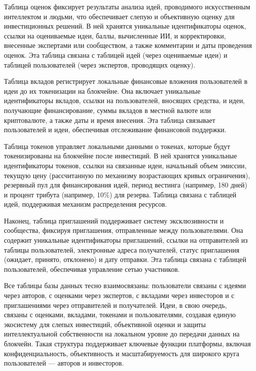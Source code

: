\documentclass[
    14pt,
    specialist,
    candidate, %
    subf, %
    href,
    dotsinheaders=false
]{disser}
\begin{document}
Таблица оценок фиксирует результаты анализа идей, проводимого искусственным интеллектом и людьми, что обеспечивает слепую и объективную оценку для инвестиционных решений. В ней хранятся уникальные идентификаторы оценок, ссылки на оцениваемые идеи, баллы, вычисленные ИИ, и корректировки, внесенные экспертами или сообществом, а также комментарии и даты проведения оценок. Эта таблица связана с таблицей идей (через оцениваемые идеи) и таблицей пользователей (через экспертов, проводящих оценку).

Таблица вкладов регистрирует локальные финансовые вложения пользователей в идеи до их токенизации на блокчейне. Она включает уникальные идентификаторы вкладов, ссылки на пользователей, вносящих средства, и идеи, получающие финансирование, суммы вкладов в местной валюте или криптовалюте, а также даты и время внесения. Эта таблица связывает пользователей и идеи, обеспечивая отслеживание финансовой поддержки.

Таблица токенов управляет локальными данными о токенах, которые будут токенизированы на блокчейне после инвестиций. В ней хранятся уникальные идентификаторы токенов, ссылки на связанные идеи, начальный объем эмиссии, текущую цену (рассчитанную по механизму возрастающих кривых ограничения), резервный пул для финансирования идей, период вестинга (например, 180 дней) и процент трибута (например, 10\%) для резерва. Таблица связана с таблицей идей, поддерживая механизм распределения ресурсов.

Наконец, таблица приглашений поддерживает систему эксклюзивности и сообщества, фиксируя приглашения, отправленные между пользователями. Она содержит уникальные идентификаторы приглашений, ссылки на отправителей из таблицы пользователей, электронные адреса получателей, статус приглашения (ожидает, принято, отклонено) и дату отправки. Эта таблица связана с таблицей пользователей, обеспечивая управление сетью участников.

Все таблицы базы данных тесно взаимосвязаны: пользователи связаны с идеями через авторов, с оценками через экспертов, с вкладами через инвесторов и с приглашениями через отправителей и получателей. Идеи, в свою очередь, связаны с оценками, вкладами, токенами и пользователями, создавая единую экосистему для слепых инвестиций, объективной оценки и защиты интеллектуальной собственности на локальном уровне до передачи данных на блокчейн. Такая структура поддерживает ключевые функции платформы, включая конфиденциальность, объективность и масштабируемость для широкого круга пользователей — авторов и инвесторов.
\end{document}
